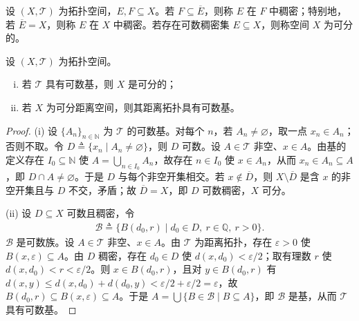 \documentclass[../main.tex]{subfiles}
\begin{document}
\begin{definition}[稠密与可分]\label{definition:appA-稠密可分}
设 $(X,\mathscr{T})$ 为拓扑空间，$E,F\subseteq X$。若 $F\subseteq\overline{E}$，则称 $E$ 在 $F$ 中稠密；特别地，若 $\overline{E}=X$，则称 $E$ 在 $X$ 中稠密。若存在可数稠密集 $E\subseteq X$，则称空间 $X$ 为可分的。
\end{definition}

\begin{proposition}\label{proposition:appA-基可分}
设 $(X,\mathscr{T})$ 为拓扑空间。
\begin{enumerate}[(i)]
\item 若 $\mathscr{T}$ 具有可数基，则 $X$ 是可分的；
\item 若 $X$ 为可分距离空间，则其距离拓扑具有可数基。
\end{enumerate}
\end{proposition}

\begin{proof}
(i) 设 $\{A_n\}_{n\in\mathbb{N}}$ 为 $\mathscr{T}$ 的可数基。对每个 $n$，若 $A_n\neq\varnothing$，取一点 $x_n\in A_n$；否则不取。令 $D\triangleq\{x_n\mid A_n\neq\varnothing\}$，则 $D$ 可数。设 $A\in\mathscr{T}$ 非空、$x\in A$。由基的定义存在 $I_0\subseteq\mathbb{N}$ 使 $A=\bigcup_{n\in I_0}A_n$，故存在 $n\in I_0$ 使 $x\in A_n$，从而 $x_n\in A_n\subseteq A$，即 $D\cap A\neq\varnothing$。于是 $D$ 与每个非空开集相交。若 $x\notin\overline{D}$，则 $X\setminus\overline{D}$ 是含 $x$ 的非空开集且与 $D$ 不交，矛盾；故 $\overline{D}=X$，即 $D$ 可数稠密，$X$ 可分。

(ii) 设 $D\subseteq X$ 可数且稠密，令
\begin{align*}
\mathscr{B}\triangleq\{B(d_0,r)\mid d_0\in D,\ r\in\mathbb{Q},\ r>0\}.
\end{align*}
$\mathscr{B}$ 是可数族。设 $A\in\mathscr{T}$ 非空、$x\in A$。由 $\mathscr{T}$ 为距离拓扑，存在 $\varepsilon>0$ 使 $B(x,\varepsilon)\subseteq A$。由 $D$ 稠密，存在 $d_0\in D$ 使 $d(x,d_0)<\varepsilon/2$；取有理数 $r$ 使 $d(x,d_0)<r<\varepsilon/2$。则 $x\in B(d_0,r)$，且对 $y\in B(d_0,r)$ 有 $d(x,y)\leqslant d(x,d_0)+d(d_0,y)<\varepsilon/2+\varepsilon/2=\varepsilon$，故 $B(d_0,r)\subseteq B(x,\varepsilon)\subseteq A$。于是 $A=\bigcup\{B\in\mathscr{B}\mid B\subseteq A\}$，即 $\mathscr{B}$ 是基，从而 $\mathscr{T}$ 具有可数基。
\end{proof}
\end{document}
